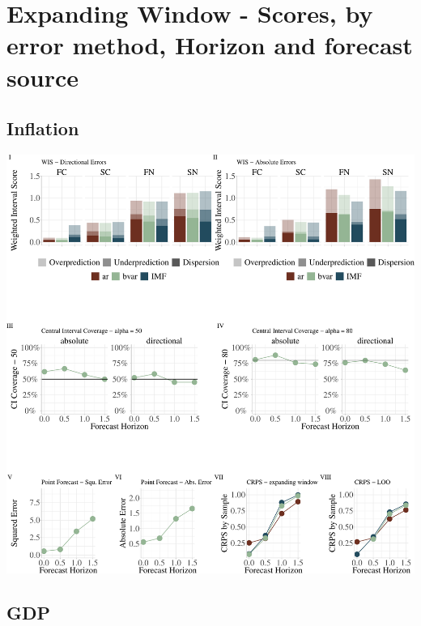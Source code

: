 \documentclass[
]{article}
\begin{document}
\hypertarget{expanding-window---scores-by-error-method-horizon-and-forecast-source}{%
\section{Expanding Window - Scores, by error method, Horizon and forecast source}\label{expanding-window---scores-by-error-method-horizon-and-forecast-source}}

\hypertarget{inflation-1}{%
\subsection{Inflation}\label{inflation-1}}

\includegraphics{manuscript_files/figure-latex/infklovr_ew-1.pdf}

\newpage

\hypertarget{gdp-1}{%
\subsection{GDP}\label{gdp-1}}
\end{document}
